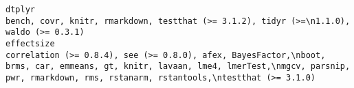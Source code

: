 \documentclass[
  letterpaper,
  DIV=11,
  numbers=noendperiod]{scrreprt}
\begin{document}
\begin{verbatim}
dtplyr                                                                                                                                                                                                                                                                                                                                                                                                                                                                                                                                                                                                                                                                                                                                                                                                                                                                                                                                                                                                                                                                                                                                                                                                                bench, covr, knitr, rmarkdown, testthat (>= 3.1.2), tidyr (>=\n1.1.0), waldo (>= 0.3.1)
effectsize                                                                                                                                                                                                                                                                                                                                                                                                                                                                                                                                                                                                                                                                                                                                                                                                                                                                                                                                                                                                                                                                                           correlation (>= 0.8.4), see (>= 0.8.0), afex, BayesFactor,\nboot, brms, car, emmeans, gt, knitr, lavaan, lme4, lmerTest,\nmgcv, parsnip, pwr, rmarkdown, rms, rstanarm, rstantools,\ntestthat (>= 3.1.0)

\end{verbatim}
\end{document}
